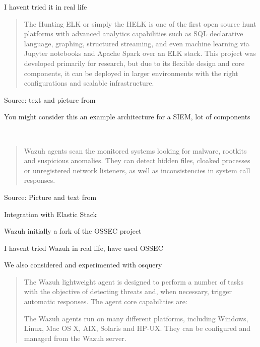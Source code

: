\documentclass[Screen16to9,17pt]{foils}
\begin{document}
\begin{list2}
\item I havent tried it in real life
\end{list2}



\begin{quote}\small
The Hunting ELK or simply the HELK is one of the first open source hunt platforms with advanced analytics capabilities such as SQL declarative language, graphing, structured streaming, and even machine learning via Jupyter notebooks and Apache Spark over an ELK stack. This project was developed primarily for research, but due to its flexible design and core components, it can be deployed in larger environments with the right configurations and scalable infrastructure.
\end{quote}
Source: text and picture from 

\begin{list2}
\item You might consider this an example architecture for a SIEM, lot of components
\end{list2}



~

\begin{quote}\small
Wazuh agents scan the monitored systems looking for malware, rootkits and suspicious anomalies. They can detect hidden files, cloaked processes or unregistered network listeners, as well as inconsistencies in system call responses.
\end{quote}
Source: Picture and text from 

\begin{list2}
\item Integration with Elastic Stack
\item Wazuh initially a fork of the OSSEC project
\item I havent tried Wazuh in real life, have used OSSEC
\item We also considered and experimented with osquery 
\end{list2}



\begin{quote}
The Wazuh lightweight agent is designed to perform a number of tasks with the objective of detecting threats and, when necessary, trigger automatic responses. The agent core capabilities are:

The Wazuh agents run on many different platforms, including Windows, Linux, Mac OS X, AIX, Solaris and HP-UX. They can be configured and managed from the Wazuh server.
\end{quote}
\end{document}
